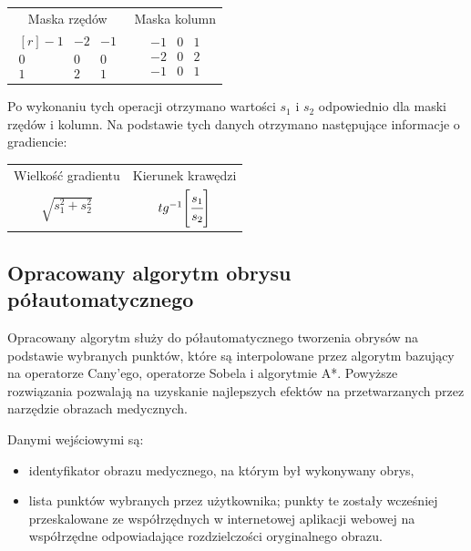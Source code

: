 \documentclass[a4paper,11pt,twoside,openright]{report}
\theoremstyle{definition}
\begin{document}
\begin{table}[h!]
\centering
\setlength{\tabcolsep}{40pt}
\begin{tabular} { c c }
  Maska rzędów & Maska kolumn \\
$
\begin{matrix*}[r]
-1 & -2 & -1 \\
0 & 0 & 0 \\
1 & 2 & 1
\end{matrix*}$
&
$\begin{matrix}
-1 & 0 & 1 \\
-2 & 0 & 2 \\
-1 & 0 & 1
\end{matrix}$
\end{tabular}
\end{table}

Po wykonaniu tych operacji otrzymano wartości $s_1$ i $s_2$ odpowiednio dla maski
rzędów i kolumn. Na podstawie tych danych otrzymano następujące informacje o gradiencie:
\begin{table}[h!]
\centering
\setlength{\tabcolsep}{30pt}
\begin{tabular} { c c }
  Wielkość gradientu & Kierunek krawędzi \\
$\sqrt{s_1^2 + s_2^2}$ & $tg^{-1} \Bigg[ {\cfrac{s_1}{s_2}} \Bigg]$
\end{tabular}
\end{table}

\subsection {Opracowany algorytm obrysu półautomatycznego}

Opracowany algorytm służy do półautomatycznego tworzenia obrysów na podstawie wybranych punktów,
które są interpolowane przez algorytm bazujący na operatorze Cany'ego, operatorze Sobela i algorytmie A*.
Powyższe rozwiązania pozwalają na uzyskanie najlepszych efektów na przetwarzanych
przez narzędzie obrazach medycznych.

Danymi wejściowymi są:
\begin{itemize}[noitemsep]
\item {identyfikator obrazu medycznego, na którym był wykonywany obrys,}
\item {lista punktów wybranych przez użytkownika; punkty te zostały wcześniej
przeskalowane ze współrzędnych w internetowej aplikacji webowej
na współrzędne odpowiadające rozdzielczości oryginalnego obrazu.}
\end{itemize}
\end{document}

